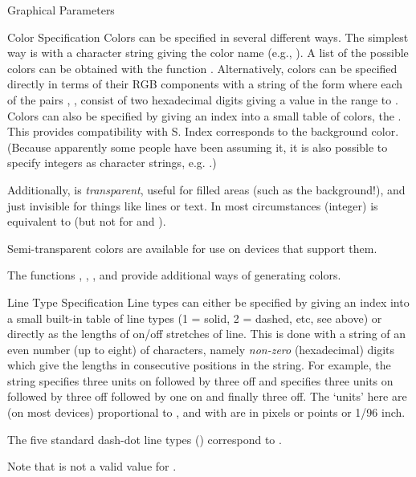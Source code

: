 \begin{Section}{Graphical Parameters}
\begin{description}
\end{description}

\end{Section}
%
\begin{Section}{Color Specification}
Colors can be specified in several different ways. The simplest way is
with a character string giving the color name (e.g., ).  A
list of the possible colors can be obtained with the function
.  Alternatively, colors can be specified directly in
terms of their RGB components with a string of the form 
where each of the pairs , ,  consist of two
hexadecimal digits giving a value in the range  to .
Colors can also be specified by giving an index into a small table of
colors, the .  This provides compatibility with
S.  Index  corresponds to the background color.  (Because
apparently some people have been assuming it, it is also possible to
specify integers as character strings, e.g. .)

Additionally,  is \emph{transparent}, useful for
filled areas (such as the background!), and just invisible for things
like lines or text.  In most circumstances (integer) 
is equivalent to  (but not for
 and ).

Semi-transparent colors are available for use on devices that support
them.

The functions , , ,
 and 
provide additional ways of generating colors.
\end{Section}
%
\begin{Section}{Line Type Specification}
Line types can either be specified by giving an index into a small
built-in table of line types (1 = solid, 2 = dashed, etc, see
 above) or directly as the lengths of on/off stretches of
line.  This is done with a string of an even number (up to eight)
of characters, namely \emph{non-zero}
(hexadecimal) digits which give the lengths in consecutive positions
in the string.  For example, the string  specifies three
units on followed by three off and  specifies three units
on followed by three off followed by one on and finally three off.
The `units' here are (on most devices) proportional to
, and with  are in pixels or points or 1/96
inch.

The five standard dash-dot line types () correspond to
.

Note that  is not a valid value for .
\end{Section}
